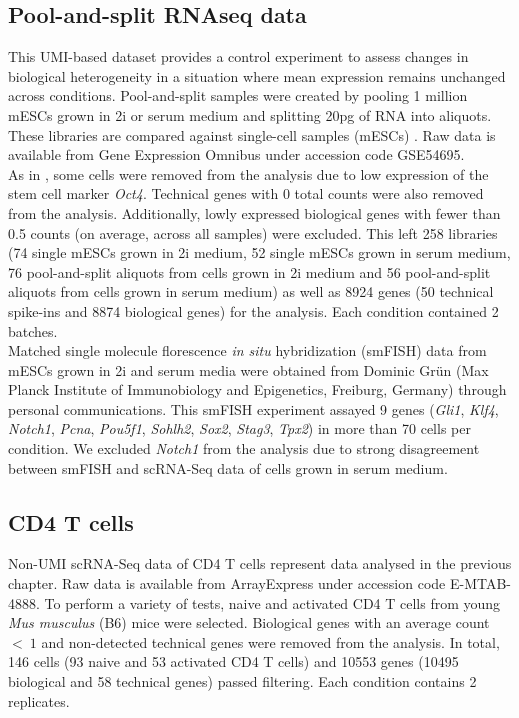 \subsection{Pool-and-split RNAseq data} \label{seq::data_PaS}

This UMI-based dataset provides a control experiment to assess changes in biological heterogeneity in a situation where mean expression remains unchanged across conditions. Pool-and-split samples were created by pooling 1 million mESCs grown in 2i or serum medium and splitting 20pg of RNA into aliquots. These libraries are compared against single-cell samples (mESCs) \citep{Grun2014}. Raw data is available from Gene Expression Omnibus under accession code GSE54695. \\

As in \cite{Grun2014}, some cells were removed from the analysis due to low expression of the stem cell marker \textit{Oct4}. Technical genes with 0 total counts were also removed from the analysis. Additionally, lowly expressed biological genes with fewer than 0.5 counts (on average, across all samples) were excluded. This left 258 libraries (74 single mESCs grown in 2i medium, 52 single mESCs grown in serum medium, 76 pool-and-split aliquots from cells grown in 2i medium and 56 pool-and-split aliquots from cells grown in serum medium) as well as 8924 genes (50 technical spike-ins and 8874 biological genes) for the analysis. Each condition contained 2 batches.\\

Matched single molecule florescence \textit{in situ} hybridization (smFISH) data from mESCs grown in 2i and serum media were obtained from Dominic Gr\"un (Max Planck Institute of Immunobiology and Epigenetics, Freiburg, Germany) through personal communications. This smFISH experiment assayed 9 genes (\textit{Gli1}, \textit{Klf4}, \textit{Notch1}, \textit{Pcna}, \textit{Pou5f1}, \textit{Sohlh2}, \textit{Sox2}, \textit{Stag3}, \textit{Tpx2}) in more than 70 cells per condition. We excluded \textit{Notch1} from the analysis due to strong disagreement between smFISH and scRNA-Seq data of cells grown in serum medium.

\subsection{CD4\plus{} T cells} \label{seq::data_cd4}

Non-UMI scRNA-Seq data of CD4\plus{} T cells represent data analysed in  the previous chapter. Raw data is available from ArrayExpress under accession code E-MTAB-4888. To perform a variety of tests, naive and activated CD4\plus{} T cells from young \emph{Mus musculus} (B6) mice were selected. Biological genes with an average count $<~1$ and non-detected technical genes were removed from the analysis. In total, 146 cells (93 naive and 53 activated CD4\plus{} T cells) and 10553 genes (10495 biological and 58 technical genes) passed filtering. Each condition contains 2 replicates.

